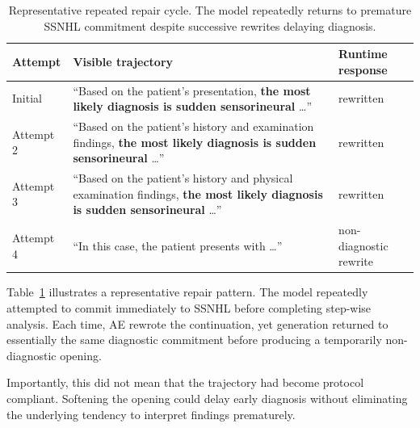 \documentclass[twocolumn]{article}
\begin{document}
\begin{table}[t]
\centering
\small
\begin{tabularx}{\columnwidth}{>{\raggedright\arraybackslash}p{}X>{\raggedright\arraybackslash}p{}}
\toprule
Attempt & Visible trajectory & Runtime response \\
\midrule
Initial &
``Based on the patient's presentation, \textbf{the most likely diagnosis is sudden sensorineural} \ldots'' &
rewritten \\
Attempt 2 &
``Based on the patient's history and examination findings, \textbf{the most likely diagnosis is sudden sensorineural} \ldots'' &
rewritten \\
Attempt 3 &
``Based on the patient's history and physical examination findings, \textbf{the most likely diagnosis is sudden sensorineural} \ldots'' &
rewritten \\
Attempt 4 &
``In this case, the patient presents with \ldots'' &
non-diagnostic rewrite \\
\bottomrule
\end{tabularx}
\caption{Representative repeated repair cycle. The model repeatedly returns to
premature SSNHL commitment despite successive rewrites delaying
diagnosis.}\label{tab:repair-cycle}
\end{table}

Table~\ref{tab:repair-cycle} illustrates a representative repair pattern. The
model repeatedly attempted to commit immediately to SSNHL before completing
step-wise analysis. Each time, AE rewrote the continuation, yet generation
returned to essentially the same diagnostic commitment before producing a
temporarily non-diagnostic opening.

Importantly, this did not mean that the trajectory had become protocol
compliant. Softening the opening could delay early diagnosis without eliminating
the underlying tendency to interpret findings prematurely.
\end{document}
